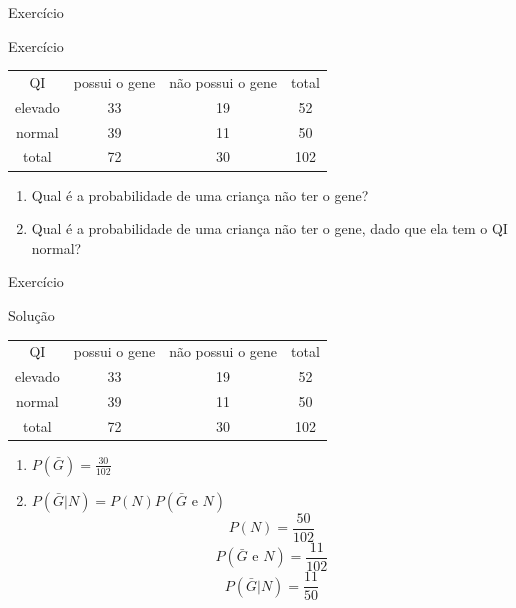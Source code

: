 \documentclass{beamer}
\begin{document}
\begin{frame}{Exercício}
  \begin{block}{Exercício}
    \begin{tabular}{ccc|c}
      QI & possui o gene & não possui o gene & total\\
      elevado & 33 & 19 & 52\\
      normal & 39 & 11 & 50\\
      \hline
      total & 72 & 30 & 102\\
    \end{tabular}
    \begin{enumerate}
    \item Qual é a probabilidade de uma criança não ter o gene?
    \item Qual é a probabilidade de uma criança não ter o gene, dado
      que ela tem o QI normal?
    \end{enumerate}
  \end{block}
\end{frame}

\begin{frame}{Exercício}
  \begin{block}{Solução}
  \begin{tabular}{ccc|c}
    QI & possui o gene & não possui o gene & total\\
    elevado & 33 & 19 & 52\\
    normal & 39 & 11 & 50\\
    \hline
    total & 72 & 30 & 102\\
  \end{tabular}
    \begin{enumerate}
    \item $P(\bar{G}) = \frac{30}{102}$
    \item $P(\bar{G}|N) = P(N)P(\bar{G} \text{ e } N)$
      \begin{displaymath}
        P(N) = \frac{50}{102}
      \end{displaymath}
      \begin{displaymath}
        P(\bar{G} \text{ e } N) = \frac{11}{102}
      \end{displaymath}
      \begin{displaymath}
        P(\bar{G}|N) = \frac{11}{50}
      \end{displaymath}
    \end{enumerate}
  \end{block}
\end{frame}

\end{document}
